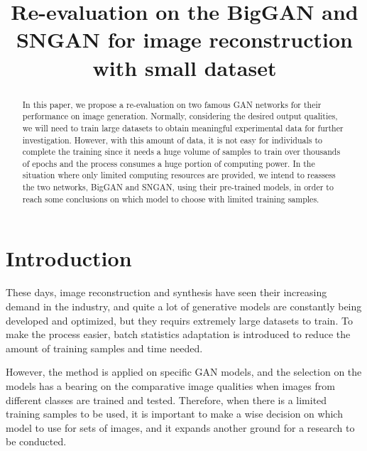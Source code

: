 \documentclass{article}
\title{Re-evaluation on the BigGAN and SNGAN for image reconstruction with small dataset}
\begin{document}
\nolinenumbers
\maketitle

\begin{abstract}
  In this paper, we propose a re-evaluation on two famous GAN networks for their performance on image generation. Normally, considering the desired output qualities, we will need to train large datasets to obtain meaningful experimental data for further investigation. However, with this amount of data, it is not easy for individuals to complete the training since it needs a huge volume of samples to train over thousands of epochs and the process consumes a huge portion of computing power. In the situation where only limited computing resources are provided, we intend to reassess the two networks, BigGAN and SNGAN, using their pre-trained models, in order to reach some conclusions on which model to choose with limited training samples.
\end{abstract}

\section{Introduction}
    These days, image reconstruction and synthesis have seen their increasing demand in the industry, and quite a lot of generative models are constantly being developed and optimized, but they requirs extremely large datasets to train. To make the process easier, batch statistics adaptation is introduced to reduce the amount of training samples and time needed. 
    
    However, the method is applied on specific GAN models, and the selection on the models has a bearing on the comparative image qualities when images from different classes are trained and tested. Therefore, when there is a limited training samples to be used, it is important to make a wise decision on which model to use for sets of images, and it expands another ground for a research to be conducted.
\end{document}
